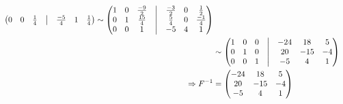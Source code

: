 \documentclass[12pt, letterpaper]{article}
\begin{document}
\begin{enumerate}
\begin{equation*}
\begin{aligned}
\begin{pmatrix}
                0 & 0 & \frac{1}{4} &\bigm| & \frac{-5}{4} & 1 & \frac{1}{4}
            \end{pmatrix}
            \sim
            \begin{pmatrix}
                1 & 0 & \frac{-9}{2} &\bigm| & \frac{-3}{2} & 0 & \frac{1}{2} \\
                0 & 1 & \frac{15}{4} &\bigm| & \frac{5}{4} & 0 & \frac{-1}{4} \\
                0 & 0 & 1 &\bigm| & -5 & 4 & 1
            \end{pmatrix} \\
            & \sim
            \begin{pmatrix}
                1 & 0 & 0 &\bigm| & -24 & 18 & 5 \\
                0 & 1 & 0 &\bigm| & 20 & -15 & -4 \\
                0 & 0 & 1 &\bigm| & -5 & 4 & 1
            \end{pmatrix} \\
            \Rightarrow F^{-1}
            & = 
            \begin{pmatrix}
                -24 & 18 & 5 \\
                20 & -15 & -4 \\
                -5 & 4 & 1
            \end{pmatrix}
        \end{aligned}
    \end{equation*}

    \newpage


\end{enumerate}
\end{document}
